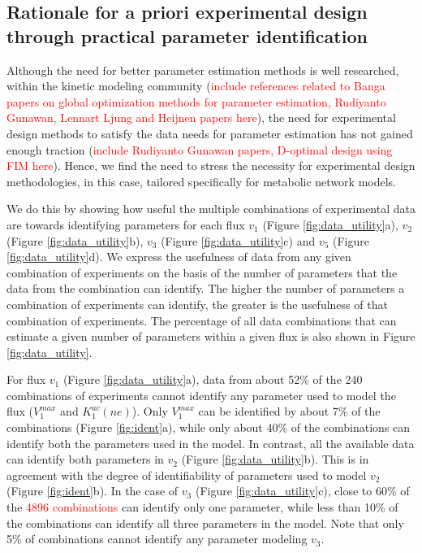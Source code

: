 \documentclass[10pt]{article}
\begin{document}
	\subsection{Rationale for a priori experimental design through practical parameter identification}\label{sec:data_utility}
	Although the need for better parameter estimation methods is well researched, within the kinetic modeling community (\textcolor{red}{include references related to Banga papers on global optimization methods for parameter estimation, Rudiyanto Gunawan, Lennart Ljung and Heijnen papers here}), the need for experimental design methods to satisfy the data needs for parameter estimation has not gained enough traction (\textcolor{red}{include Rudiyanto Gunawan papers, D-optimal design using FIM here}). Hence, we find the need to stress the necessity for experimental design methodologies, in this case, tailored specifically for metabolic network models. 	
	
	We do this by showing how useful the multiple combinations of experimental data are towards identifying parameters for each flux $v_1$ (Figure \ref{fig:data_utility}a), $v_2$ (Figure \ref{fig:data_utility}b), $v_3$ (Figure \ref{fig:data_utility}c) and $v_5$ (Figure \ref{fig:data_utility}d). We express the usefulness of data from any given combination of experiments on the basis of the number of parameters that the data from the combination can identify. The higher the number of parameters a combination of experiments can identify, the greater is the usefulness of that combination of experiments. The percentage of all data combinations that can estimate a given number of parameters within a given flux is also shown in Figure \ref{fig:data_utility}.
	
	For flux $v_1$ (Figure \ref{fig:data_utility}a), data from about 52\% of the 240 combinations of experiments cannot identify any parameter used to model the flux ($V_1^{max}$ and $K_1^{ac}(ne)$). Only $V_1^{max}$ can be identified by about 7\% of the combinations (Figure \ref{fig:ident}a), while only about 40\% of the combinations can identify both the parameters used in the model. 	
	In contrast, all the available data can identify both parameters in $v_2$ (Figure \ref{fig:data_utility}b). This is in agreement with the degree of identifiability of parameters used to model $v_2$ (Figure \ref{fig:ident}b). In the case of $v_3$ (Figure \ref{fig:data_utility}c), close to 60\% of the \textcolor{red}{4896 combinations} can identify only one parameter, while less than 10\% of the combinations can identify all three parameters in the model. Note that only 5\% of combinations cannot identify any parameter modeling $v_3$. 
	
\end{document}
